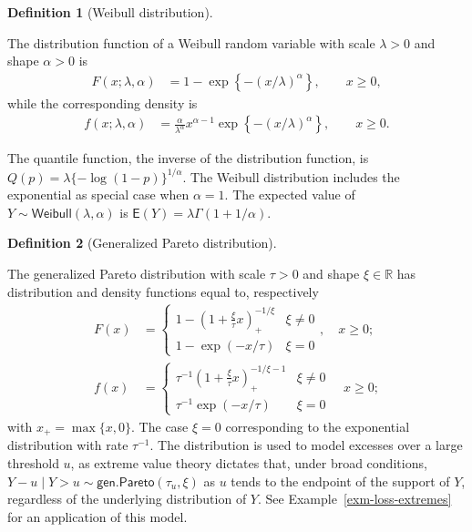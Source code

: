 \documentclass[
  11pt,
  letterpaper,
]{scrbook}
\theoremstyle{definition}
\theoremstyle{plain}
\theoremstyle{plain}
\theoremstyle{plain}
\theoremstyle{definition}
\theoremstyle{definition}
\newtheorem{definition}{Definition}[chapter]
\theoremstyle{plain}
\theoremstyle{plain}
\theoremstyle{remark}
\begin{document}
\begin{definition}[Weibull
distribution]\protect\hypertarget{def-weibull}{}\label{def-weibull}

The distribution function of a Weibull random variable with scale
\(\lambda>0\) and shape \(\alpha>0\) is \begin{align*}
F(x; \lambda, \alpha) &= 1 - \exp\left\{-(x/\lambda)^\alpha\right\}, \qquad x \geq 0,
\end{align*} while the corresponding density is \begin{align*}
f(x; \lambda, \alpha) &= \frac{\alpha}{\lambda^\alpha} x^{\alpha-1}\exp\left\{-(x/\lambda)^\alpha\right\}, \qquad x \geq 0.
\end{align*}

The quantile function, the inverse of the distribution function, is
\(Q(p) = \lambda\{-\log(1-p)\}^{1/\alpha}.\) The Weibull distribution
includes the exponential as special case when \(\alpha=1.\) The expected
value of \(Y \sim \mathsf{Weibull}(\lambda, \alpha)\) is
\(\mathsf{E}(Y) = \lambda \Gamma(1+1/\alpha).\)

\end{definition}

\begin{definition}[Generalized Pareto
distribution]\protect\hypertarget{def-gen-pareto}{}\label{def-gen-pareto}

The generalized Pareto distribution with scale \(\tau>0\) and shape
\(\xi \in \mathbb{R}\) has distribution and density functions equal to,
respectively \begin{align*}
F(x) &=
\begin{cases} 
1 - \left(1+\frac{\xi}{\tau}x\right)_{+}^{-1/\xi} & \xi \neq 0 \\
1 - \exp(-x/\tau) & \xi=0 
\end{cases}, \quad x \geq 0; \\
f(x) &=
\begin{cases} 
\tau^{-1}\left(1+\frac{\xi}{\tau}x\right)_{+}^{-1/\xi-1} & \xi \neq 0 \\
\tau^{-1}\exp(-x/\tau) & \xi=0 
\end{cases}\quad x \geq 0;
\end{align*} with \(x_{+} = \max\{x, 0\}.\) The case \(\xi=0\)
corresponding to the exponential distribution with rate \(\tau^{-1}\).
The distribution is used to model excesses over a large threshold \(u\),
as extreme value theory dictates that, under broad conditions,
\(Y-u \mid Y > u \sim \mathsf{gen. Pareto}(\tau_u, \xi)\) as \(u\) tends
to the endpoint of the support of \(Y\), regardless of the underlying
distribution of \(Y\). See Example~\ref{exm-loss-extremes} for an
application of this model.

\end{definition}
\end{document}
